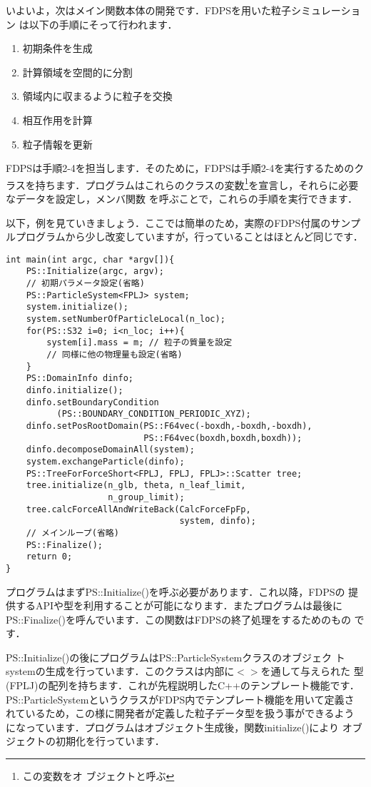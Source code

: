 \documentclass[twocolumn,10pt]{jarticle}
\begin{document}
いよいよ，次はメイン関数本体の開発です．FDPSを用いた粒子シミュレーション
は以下の手順にそって行われます．

\begin{enumerate}
\item 初期条件を生成
\item 計算領域を空間的に分割
\item 領域内に収まるように粒子を交換
\item 相互作用を計算
\item 粒子情報を更新
\end{enumerate}

FDPSは手順2-4を担当します．そのために，FDPSは手順2-4を実行するためのク
ラスを持ちます．プログラムはこれらのクラスの変数\footnote{この変数をオ
  ブジェクトと呼ぶ}を宣言し，それらに必要なデータを設定し，メンバ関数
を呼ぶことで，これらの手順を実行できます．

以下，例を見ていきましょう．ここでは簡単のため，実際のFDPS付属のサンプ
ルプログラムから少し改変していますが，行っていることはほとんど同じです．

{\scriptsize
\begin{verbatim}
int main(int argc, char *argv[]){
    PS::Initialize(argc, argv);
    // 初期パラメータ設定(省略)
    PS::ParticleSystem<FPLJ> system;
    system.initialize();
    system.setNumberOfParticleLocal(n_loc);
    for(PS::S32 i=0; i<n_loc; i++){
        system[i].mass = m; // 粒子の質量を設定
        // 同様に他の物理量も設定(省略)
    }
    PS::DomainInfo dinfo;
    dinfo.initialize();
    dinfo.setBoundaryCondition
          (PS::BOUNDARY_CONDITION_PERIODIC_XYZ);
    dinfo.setPosRootDomain(PS::F64vec(-boxdh,-boxdh,-boxdh),
                           PS::F64vec(boxdh,boxdh,boxdh));
    dinfo.decomposeDomainAll(system);
    system.exchangeParticle(dinfo);
    PS::TreeForForceShort<FPLJ, FPLJ, FPLJ>::Scatter tree;
    tree.initialize(n_glb, theta, n_leaf_limit, 
                    n_group_limit);
    tree.calcForceAllAndWriteBack(CalcForceFpFp, 
                                  system, dinfo);
    // メインループ(省略)
    PS::Finalize();
    return 0;
}
\end{verbatim}
}

プログラムはまずPS::Initialize()を呼ぶ必要があります．これ以降，FDPSの
提供するAPIや型を利用することが可能になります．またプログラムは最後に
PS::Finalize()を呼んでいます．この関数はFDPSの終了処理をするためのもの
です．

PS::Initialize()の後にプログラムはPS::ParticleSystemクラスのオブジェク
トsystemの生成を行っています．このクラスは内部に$<>$を通して与えられた
型(FPLJ)の配列を持ちます．これが先程説明したC++のテンプレート機能です．
PS::ParticleSystemというクラスがFDPS内でテンプレート機能を用いて定義さ
れているため，この様に開発者が定義した粒子データ型を扱う事ができるよう
になっています．プログラムはオブジェクト生成後，関数initialize()により
オブジェクトの初期化を行っています．
\end{document}
